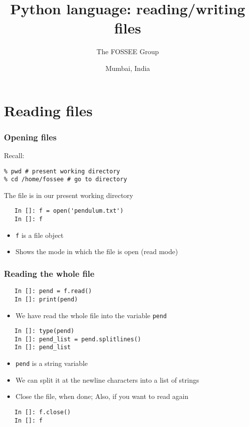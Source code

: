 \documentclass[14pt,compress]{beamer}
\title[Functions]{Python language: reading/writing files}
\author[FOSSEE Team] {The FOSSEE Group}
\institute[IIT Bombay] {Department of Aerospace Engineering\\IIT Bombay}
\date[] {Mumbai, India}
\begin{document}
\begin{frame}
  \titlepage
\end{frame}

\section{Reading files}

\begin{frame}[fragile]
  \frametitle{Opening files}
  Recall:
  \begin{lstlisting}
% pwd # present working directory
% cd /home/fossee # go to directory
  \end{lstlisting}
  {\small The file is in our present working directory}
  \begin{lstlisting}
   In []: f = open('pendulum.txt')
   In []: f
  \end{lstlisting}
  \begin{itemize}
  \item \texttt{f} is a file object
  \item Shows the mode in which the file is open (read mode)
  \end{itemize}
\end{frame}

\begin{frame}[fragile]
  \frametitle{Reading the whole file}
  \begin{lstlisting}
   In []: pend = f.read()
   In []: print(pend)
  \end{lstlisting}
  \begin{itemize}
  \item We have read the whole file into the variable \texttt{pend}
  \end{itemize}
  \begin{lstlisting}
   In []: type(pend)
   In []: pend_list = pend.splitlines()
   In []: pend_list
  \end{lstlisting}
  \begin{itemize}
  \item  \texttt{pend} is a string variable
  \item We can split it at the newline characters into a list of
    strings
  \item Close the file, when done; Also, if you want to read again
  \end{itemize}
  \begin{lstlisting}
   In []: f.close()
   In []: f
 \end{lstlisting}
\end{frame}
\end{document}
